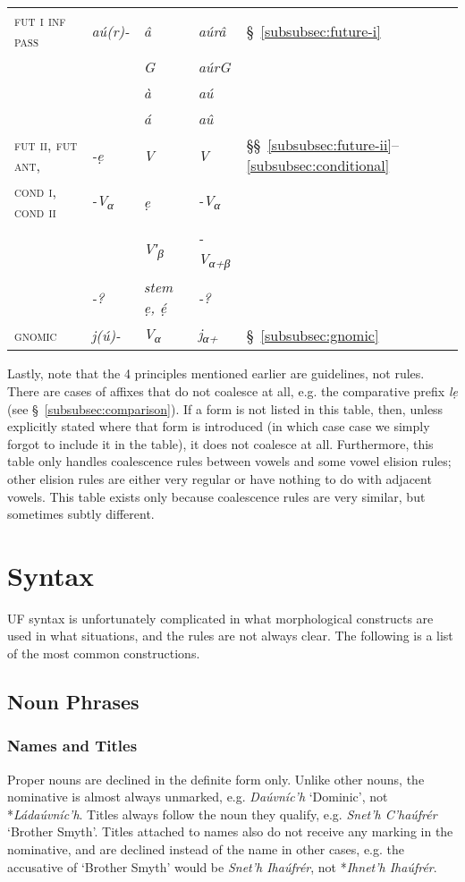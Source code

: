 \documentclass[a4paper, 12pt, twoside, final]{article}
\let \nf \normalfont
\let \w \textit
\let \Sub \textsubscript
\begin{document}
{\begin{longtable}{@{}>{\scshape}l|>{\it}p{5em}|>{\it}l|>{\it}l|l}
fut i inf pass    & aú(r)-  & â & aúrâ & §~\ref{subsubsec:future-i} \\
                  &         &\nf G & aúr\kern1pt\nf G \\
                  &         & à & aú \\
                  &         & á & aû \\\hline
fut ii, fut ant,  & -ẹ      &\nf V &\nf V &§§~\ref{subsubsec:future-ii}–\ref{subsubsec:conditional}\\
cond i, cond ii   &{\nf -V}\Sub α\nf & ẹ & {\nf -V}\Sub α\nf \\
                  &         & {\nf V′}\Sub{β} & {\nf -V}\Sub{α+β} \\
                  &\nf -?   &{\nf stem} ẹ, ẹ́ &\nf -? \\
gnomic            & j(ú)-   & {\nf V}\Sub α& j\kern1pt{\nf V}\Sub{α+} &§~\ref{subsubsec:gnomic} \\\hline
\end{longtable}\par}
\medskip

\noindent Lastly, note that the 4 principles mentioned earlier are guidelines, not rules. There are cases of affixes that do not coalesce
at all, e.g. the comparative prefix \w{lẹ} (see §~\ref{subsubsec:comparison}). If a form is not listed in this table, then,
unless explicitly stated where that form is introduced (in which case case we simply forgot to include it in the table),
it does not coalesce at all. Furthermore, this table only handles coalescence rules between vowels and some vowel elision rules; other
elision rules are either very regular or have nothing to do with adjacent vowels. This table exists only because coalescence rules are
very similar, but sometimes subtly different.

\section{Syntax}\label{sec:syntax}
UF syntax is unfortunately complicated in what morphological constructs are used in what situations, and
the rules are not always clear. The following is a list of the most common constructions.

\subsection{Noun Phrases}
\subsubsection{Names and Titles}\label{subsubsec:names-and-titles}
Proper nouns are declined in the definite form only. Unlike other nouns, the nominative is almost always
unmarked, e.g. \w{Daúvníc’h} ‘Dominic’, not *\w{Ládaúvníc’h}. Titles always follow the noun they qualify,
e.g. \w{Snet’h C’haúfrér} ‘Brother Smyth’. Titles attached to names also do not receive any marking in the
nominative, and are declined instead of the name in other cases, e.g. the accusative of ‘Brother Smyth’
would be \w{Snet’h Ihaúfrér}, not *\w{Ihnet’h Ihaúfrér}.
\end{document}
